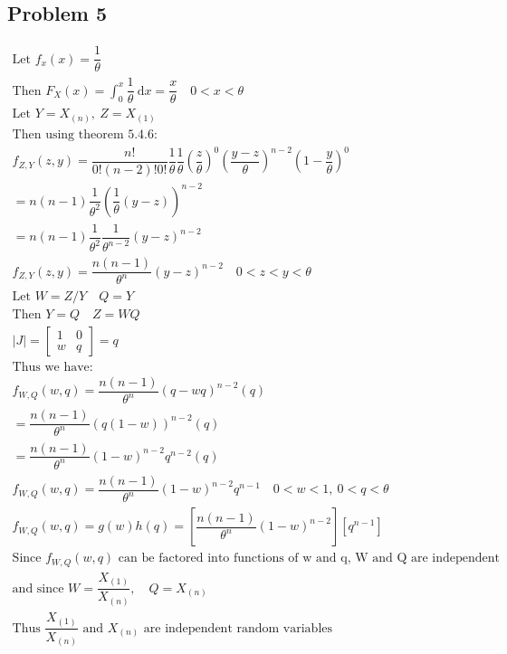 \documentclass{article}
\newcommand{\dx}{\mathrm{d}x}
\begin{document}
\begin{flushleft}
\section*{Problem 5}
\begin{multline*}
\text{Let } f_x(x)=\dfrac{1}{\theta}\\
\text{Then } F_X(x)=\int_{0}^{x}\dfrac{1}{\theta}\ \dx=\dfrac{x}{\theta} \quad 0<x<\theta\\
\text{Let } Y=X_{(n)}, \ Z=X_{(1)}\\
\text{Then using theorem 5.4.6:}\\
f_{Z,Y}(z,y)=\dfrac{n!}{0!(n-2)!0!}\dfrac{1}{\theta}\dfrac{1}{\theta}\left(\dfrac{z}{\theta}\right)^0\left(\dfrac{y-z}{\theta}\right)^{n-2}\left(1-\dfrac{y}{\theta}\right)^0\\
=n(n-1)\dfrac{1}{\theta^2}\left(\dfrac{1}{\theta}(y-z)\right)^{n-2}\\
=n(n-1)\dfrac{1}{\theta^2}\dfrac{1}{\theta^{n-2}}(y-z)^{n-2}\\
f_{Z,Y}(z,y)=\dfrac{n(n-1)}{\theta^n}(y-z)^{n-2} \quad 0<z<y<\theta\\
\text{Let } W=Z/Y \quad Q=Y\\
\text{Then } Y=Q \quad Z=WQ\\
|J|=\begin{bmatrix}
1 & 0 \\
w & q
\end{bmatrix}=q\\
\text{Thus we have: }\\
f_{W,Q}(w,q)=\dfrac{n(n-1)}{\theta^n}(q-wq)^{n-2}(q)\\
=\dfrac{n(n-1)}{\theta^n}(q(1-w))^{n-2}(q)\\
=\dfrac{n(n-1)}{\theta^n}(1-w)^{n-2}q^{n-2}(q)\\
f_{W,Q}(w,q)=\dfrac{n(n-1)}{\theta^n}(1-w)^{n-2}q^{n-1} \quad 0<w<1, \ 0<q<\theta\\
f_{W,Q}(w,q)=g(w)h(q)=\left[\dfrac{n(n-1)}{\theta^n}(1-w)^{n-2}\right]\left[q^{n-1}\right]\\
\text{Since } f_{W,Q}(w,q) \text{ can be factored into functions of w and q, W and Q are independent}\\
\text{and since } W=\dfrac{X_{(1)}}{X_{(n)}}, \quad  Q=X_{(n)}\\
\text{Thus } \dfrac{X_{(1)}}{X_{(n)}} \text{ and } X_{(n)} \text{ are independent random variables}\\
\end{multline*}

\end{flushleft}
\end{document}
